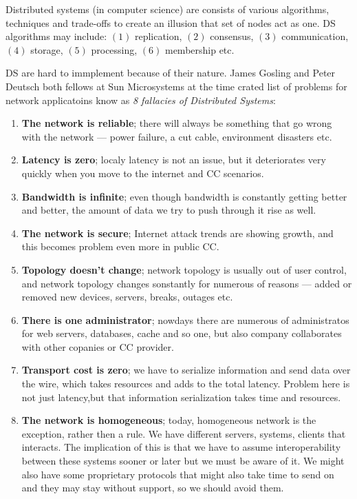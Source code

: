Distributed systems (in computer science) are consists of various algorithms, techniques and trade-offs to create an illusion that set of nodes act as one. DS algorithms may include: $(1)$ replication, $(2)$ consensus, $(3)$ communication, $(4)$ storage, $(5)$ processing, $(6)$ membership etc.

DS are hard to immplement because of their nature. James Gosling and Peter Deutsch both fellows at Sun Microsystems at the time crated list of problems for network applicatoins know as \textit{8 fallacies of Distributed Systems}:\label{enum:fallacies}

\begin{enumerate}[start=1,label={(\bfseries \arabic*)}]\label{ds:8_fallacies}
	\item \textbf{The network is reliable}; there will always be something that go wrong with the network --- power failure, a cut cable, environment disasters etc.
	\item \textbf{Latency is zero}; localy latency is not an issue, but it deteriorates very quickly when you move to the internet and CC scenarios.
	\item \textbf{Bandwidth is infinite}; even though bandwidth is constantly getting better and better, the amount of data we try to push through it rise as well.
	\item \textbf{The network is secure};  Internet attack trends are showing growth, and this becomes problem even more in public CC.
	\item \textbf{Topology doesn't change}; network topology is usually out of user control, and network topology changes sonstantly for numerous of reasons --- added or removed new devices, servers, breaks, outages etc.
	\item \textbf{There is one administrator}; nowdays there are numerous of administratos for web servers, databases, cache and so one, but also company collaborates with other copanies or CC provider.
	\item \textbf{Transport cost is zero}; we have to serialize information and send data over the wire, which takes resources and adds to the total latency. Problem here is not just latency,but that information serialization takes time and resources.
	\item \textbf{The network is homogeneous}; today, homogeneous network is the exception, rather then a rule. We have different servers, systems, clients that interacts. The implication of this is that we have to assume interoperability between these systems sooner or later but we must be aware of it. We might also have some  proprietary protocols that might also take time to send on and they may stay without support, so we should avoid them.
\end{enumerate}


